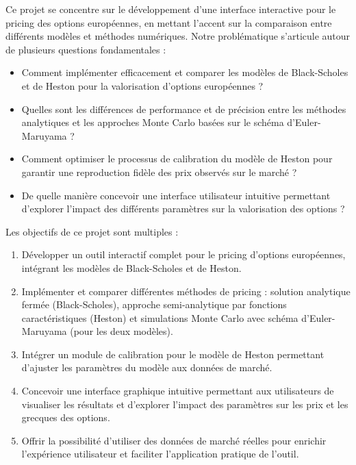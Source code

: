 Ce projet se concentre sur le développement d'une interface interactive pour le pricing des options européennes, en mettant l'accent sur la comparaison entre différents modèles et méthodes numériques. Notre problématique s'articule autour de plusieurs questions fondamentales :

\begin{itemize}
	\item Comment implémenter efficacement et comparer les modèles de Black-Scholes et de Heston pour la valorisation d'options européennes ?
	
	\item Quelles sont les différences de performance et de précision entre les méthodes analytiques et les approches Monte Carlo basées sur le schéma d'Euler-Maruyama ?
	
	\item Comment optimiser le processus de calibration du modèle de Heston pour garantir une reproduction fidèle des prix observés sur le marché ?
	
	\item De quelle manière concevoir une interface utilisateur intuitive permettant d'explorer l'impact des différents paramètres sur la valorisation des options ?
\end{itemize}

Les objectifs de ce projet sont multiples :

\begin{enumerate}
	\item Développer un outil interactif complet pour le pricing d'options européennes, intégrant les modèles de Black-Scholes et de Heston.
	
	\item Implémenter et comparer différentes méthodes de pricing : solution analytique fermée (Black-Scholes), approche semi-analytique par fonctions caractéristiques (Heston) et simulations Monte Carlo avec schéma d'Euler-Maruyama (pour les deux modèles).
	
	\item Intégrer un module de calibration pour le modèle de Heston permettant d'ajuster les paramètres du modèle aux données de marché.
	
	\item Concevoir une interface graphique intuitive permettant aux utilisateurs de visualiser les résultats et d'explorer l'impact des paramètres sur les prix et les grecques des options.
	
	\item Offrir la possibilité d'utiliser des données de marché réelles pour enrichir l'expérience utilisateur et faciliter l'application pratique de l'outil.
\end{enumerate}


